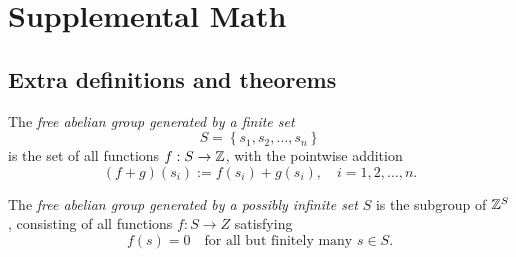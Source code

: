 \chapter{Supplemental Math}

\section{Extra definitions and theorems}

\begin{defn} \label{ap:abeliandef}
	The \textit{free abelian group generated by a finite set}
	$$ S = \left\{s_1, s_2, \ldots, s_n \right\} $$
	is the set of all functions $ f : S \rightarrow \mathbb{Z}$, with the pointwise addition
		$$ (f + g)(s_i) := f(s_i) + g(s_i), \quad i = 1, 2, \ldots, n . $$
\end{defn}

\begin{defn} \label{ap:freeabeliandef}
	The \textit{free abelian group generated by a possibly infinite set} $S$ is the subgroup of $\mathbb{Z}^S$, consisting of all functions $f : S \rightarrow Z$ satisfying
	$$ f(s) = 0 \quad \text{for all but finitely many } s \in S. $$
\end{defn}